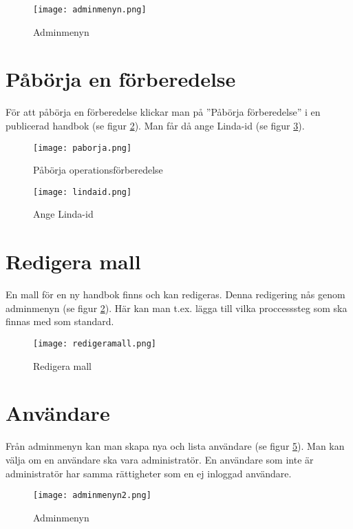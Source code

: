 \documentclass[12pt]{amsart}
\begin{document}
\begin{figure}[H]
	\begin{center}
	\texttt{[image: adminmenyn.png]}
	\caption{Adminmenyn}
	\label{fig:adminmenyn}
	\end{center}
\end{figure}

\section{Påbörja en förberedelse}
För att påbörja en förberedelse klickar man på ''Påbörja förberedelse'' i en publicerad handbok (se figur \ref{fig:paborja}). Man får då ange Linda-id (se figur \ref{fig:lindaid}).

\begin{figure}[H]
	\begin{center}
	\texttt{[image: paborja.png]}
	\caption{Påbörja operationsförberedelse}
	\label{fig:paborja}
	\end{center}
\end{figure}

\begin{figure}[H]
	\begin{center}
	\texttt{[image: lindaid.png]}
	\caption{Ange Linda-id}
	\label{fig:lindaid}
	\end{center}
\end{figure}

\section{Redigera mall}
En mall för en ny handbok finns och kan redigeras. Denna redigering nås genom adminmenyn (se figur \ref{fig:paborja}). Här kan man t.ex. lägga till vilka proccesssteg som ska finnas med som standard.

\begin{figure}[H]
	\begin{center}
	\texttt{[image: redigeramall.png]}
	\caption{Redigera mall}
	\label{fig:redigeramall}
	\end{center}
\end{figure}

\section{Användare}
Från adminmenyn kan man skapa nya och lista användare (se figur \ref{fig:adminmenyn2}). Man kan välja om en användare ska vara administratör. En användare som inte är administratör har samma rättigheter som en ej inloggad användare.

\begin{figure}[H]
	\begin{center}
	\texttt{[image: adminmenyn2.png]}
	\caption{Adminmenyn}
	\label{fig:adminmenyn2}
	\end{center}
\end{figure}
\end{document}
